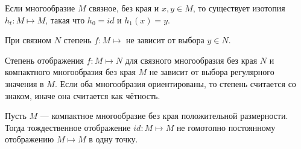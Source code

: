 \begin{to_lem}
	Если многообразие $M$ связное, без края и $x,y \in M$, то существует изотопия $h_t \colon M \mapsto M $, такая что $h_0 = id$ и $h_1(x)  = y$.
\end{to_lem}

\begin{to_con}
	При связном $N$ степень $f \colon M \mapsto$ не зависит от выбора $y \in N$.
\end{to_con}

\begin{to_thr}
	Степень отображения $f \colon M \mapsto N$ для связного многообразия без края $N$ и компактного многообразия без края $M$ не зависит от выбора регулярного значения в $M$. Если оба многообразия ориентированы, то степень считается со знаком, иначе она считается как чётность.
\end{to_thr}

\begin{to_con}
	Пусть $M$ --- компактное многообразие без края положительной размерности. Тогда тождественное отображение $id\colon M \mapsto M$ не гомотопно постоянному отображению $M \mapsto M$ в одну точку.
\end{to_con}
